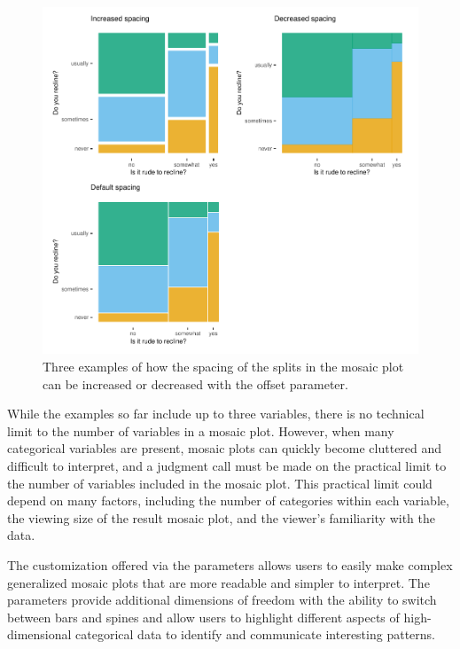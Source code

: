 \begin{figure}

{\centering \includegraphics[width=1\linewidth]{jeppson-hofmann_files/figure-latex/space-1} 

}

\caption{Three examples of how the spacing of the splits in the mosaic plot can be increased or decreased with the offset parameter.}\label{fig:space}
\end{figure}

While the examples so far include up to three variables, there is no technical limit to the number of variables in a mosaic plot. However, when many categorical variables are present, mosaic plots can quickly become cluttered and difficult to interpret, and a judgment call must be made on the practical limit to the number of variables included in the mosaic plot. This practical limit could depend on many factors, including the number of categories within each variable, the viewing size of the result mosaic plot, and the viewer's familiarity with the data.

The customization offered via the  parameters allows users to easily make complex generalized mosaic plots that are more readable and simpler to interpret. The parameters provide additional dimensions of freedom with the ability to switch between bars and spines and allow users to highlight different aspects of high-dimensional categorical data to identify and communicate interesting patterns.

